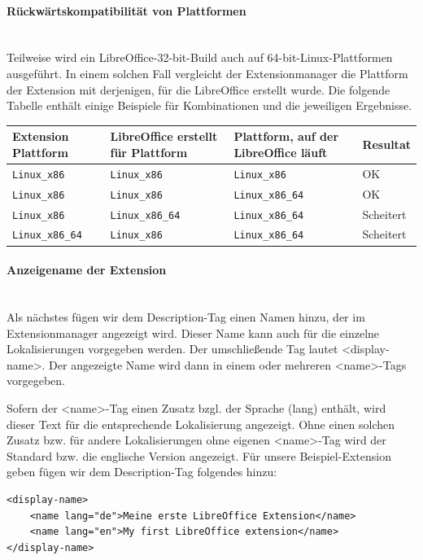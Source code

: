 \documentclass[a4paper,10pt,pagesize,titlepage]{scrbook}
\begin{document}
\paragraph*{Rückwärtskompatibilität von Plattformen}$~~$\\
Teilweise wird ein LibreOffice-32-bit-Build auch auf 64-bit-Linux-Plattformen ausgeführt. In einem solchen Fall vergleicht der Extensionmanager die Plattform der Extension mit derjenigen, für die LibreOffice erstellt wurde. Die folgende Tabelle enthält einige Beispiele für Kombinationen und die jeweiligen Ergebnisse. 


\begin{tabular}{|p{3.0cm}|p{3.0cm}|p{3.0cm}|p{1.5cm}|}
	\hline \rowcolor{hellgrau} \rule[-2ex]{0pt}{5.5ex}  Extension Plattform & LibreOffice erstellt für Plattform & Plattform, auf der LibreOffice läuft  & Resultat \\
	\hline \rule[-2ex]{0pt}{5.5ex} \verb|Linux_x86 | & \verb|Linux_x86 | & \verb|Linux_x86 | & OK \\ 
	\hline \rule[-2ex]{0pt}{5.5ex} \verb|Linux_x86 | & \verb|Linux_x86 | & \verb|Linux_x86_64 | & OK \\ 
	\hline \rule[-2ex]{0pt}{5.5ex} \verb|Linux_x86 | & \verb|Linux_x86_64 | & \verb|Linux_x86_64 | & Scheitert \\ 
	\hline \rule[-2ex]{0pt}{5.5ex} \verb|Linux_x86_64 | & \verb|Linux_x86 | & \verb|Linux_x86_64 | & Scheitert \\ 
	\hline 
\end{tabular}
\paragraph*{Anzeigename der Extension}$~~$\\

Als nächstes fügen wir dem Description-Tag einen Namen hinzu, der im Extensionmanager angezeigt wird. Dieser Name kann auch für die einzelne Lokalisierungen vorgegeben werden. Der umschließende Tag lautet <display-name>.
Der angezeigte Name wird dann in einem oder mehreren <name>-Tags vorgegeben.

Sofern der <name>-Tag einen Zusatz bzgl. der Sprache (lang) enthält, wird dieser Text für die entsprechende Lokalisierung angezeigt. Ohne einen solchen Zusatz bzw. für andere Lokalisierungen ohne eigenen <name>-Tag wird der Standard bzw. die englische Version angezeigt. Für unsere Beispiel-Extension geben fügen wir dem Description-Tag folgendes hinzu:
\begin{lstlisting}
<display-name>
    <name lang="de">Meine erste LibreOffice Extension</name>
    <name lang="en">My first LibreOffice extension</name>
</display-name>
\end{lstlisting}
\end{document}
